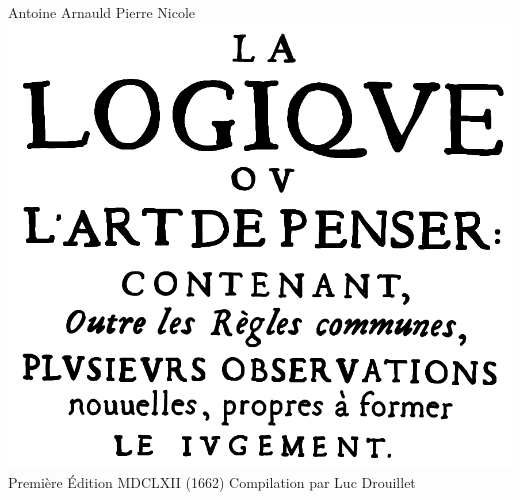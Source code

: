 \vspace*{\fill}
\begingroup

\begin{center}
	{\LARGE Antoine Arnauld}
	\bigbreak
	{\LARGE Pierre Nicole}
	\bigbreak\bigbreak
	\includegraphics[scale=0.24]{images/titre-complet.png}
	\bigbreak
	{\Large Première Édition}
	\medbreak
	{\large MDCLXII}
	\smallbreak
	{(1662)}
	\bigbreak\bigbreak\bigbreak\bigbreak\bigbreak\bigbreak
	{\tiny Compilation par Luc Drouillet}
\end{center}

\endgroup
\vspace*{\fill}

\newpage

